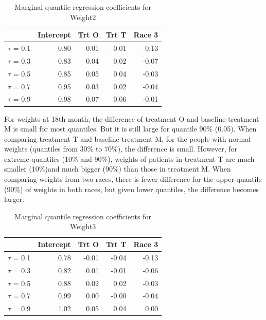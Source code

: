 \documentclass[12pt]{article}
\begin{document}
\begin{table}[ht]
\begin{center}
\caption{Marginal quantile regression coefficients for Weight2}\label{tab:w2}
\begin{tabular}{rrrrr}
  \hline
            & Intercept & Trt O & Trt T & Race 3 \\
  \hline
  $\tau$ = 0.1   & 0.80      & 0.01  & -0.01 & -0.13  \\
  $\tau$ = 0.3 & 0.83      & 0.04  & 0.02  & -0.07  \\
  $\tau$ = 0.5 & 0.85      & 0.05  & 0.04  & -0.03  \\
  $\tau$ = 0.7 & 0.95      & 0.03  & 0.02  & -0.04  \\
  $\tau$ = 0.9 & 0.98      & 0.07  & 0.06  & -0.01  \\
   \hline
\end{tabular}
\end{center}
\end{table}

For weights at 18th month, the difference of treatment O and baseline treatment M is small for most quantiles. But it is still large for quantile 90\% (0.05). When comparing treatment T and baseline treatment M, for the  people with normal weights (quantiles from  30\% to 70\%), the difference is small. However, for extreme quantiles (10\% and 90\%), weights of patients in treatment T are much smaller (10\%)and much bigger (90\%) than those in treatment M. When comparing weights from two races,  there is fewer difference for the upper quantile (90\%) of weights in both races, but given lower quantiles, the difference becomes larger. 

\begin{table}[ht]
\begin{center}
\caption{Marginal quantile regression coefficients for Weight3}\label{tab:w3}
\begin{tabular}{rrrrr}
  \hline
            & Intercept & Trt O & Trt T & Race 3 \\
  \hline
  $\tau$ = 0.1 & 0.78      & -0.01 & -0.04 & -0.13  \\
  $\tau$ = 0.3 & 0.82      & 0.01  & -0.01 & -0.06  \\
  $\tau$ = 0.5 & 0.88      & 0.02  & 0.02  & -0.03  \\
  $\tau$ = 0.7 & 0.99      & 0.00  & -0.00 & -0.04  \\
  $\tau$ = 0.9 & 1.02      & 0.05  & 0.04  & 0.00   \\
   \hline
\end{tabular}
\end{center}
\end{table}
\end{document}

